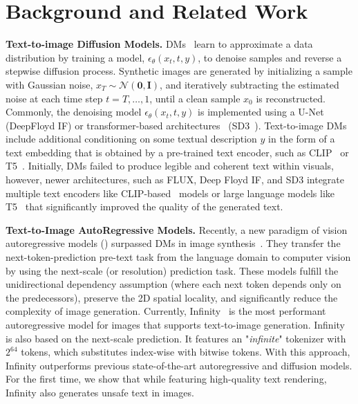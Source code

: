 \section{Background and Related Work}

\textbf{Text-to-image Diffusion Models.}
DMs~\citep{song2020,ho2020,rombach2022high} learn to approximate a data distribution by training a model, $\epsilon_\theta(x_t, t, y)$, to denoise samples and reverse a stepwise diffusion process. Synthetic images are generated by initializing a sample with Gaussian noise, $x_T \sim \mathcal{N}(\mathbf{0}, \mathbf{I})$, and iteratively subtracting the estimated noise at each time step $t = T, \ldots, 1$, until a clean sample $x_0$ is reconstructed. 
Commonly, the denoising model $\epsilon_\theta(x_t, t, y)$ is implemented using a U-Net~\citep{ronneberger2015unet} (\eg DeepFloyd IF) or transformer-based architectures~\citep{vaswani2017attention} (\eg SD3~\citep{esser2024scalingSD3}). 
Text-to-image DMs~\citep{dalle_2,rombach2022high,DeepFloydIF} include additional conditioning on some textual description $y$ in the form of a text embedding that is obtained by a pre-trained text encoder, such as CLIP~\citep{clip} or T5~\citep{raffel2020exploringT5}.
Initially, DMs failed to produce legible and coherent text within visuals, however, newer architectures, such as FLUX, Deep Floyd IF, and SD3 integrate multiple text encoders like CLIP-based~\citep{clip} models or large language models like T5~\citep{raffel2020exploringT5} that significantly improved the quality of the generated text.

\textbf{Text-to-Image AutoRegressive Models.} Recently, a new paradigm of vision autoregressive models (\VARs) surpassed DMs in image synthesis~\citep{tian2024visual,tang2024hart}. They transfer the next-token-prediction pre-text task from the language domain to computer vision by using the next-scale (or resolution) prediction task. These models fulfill the unidirectional dependency assumption (where each next token depends only on the predecessors), preserve the 2D spatial locality, and significantly reduce the complexity of image generation. Currently, Infinity~\citep{han2024infinity} is the most performant autoregressive model for images that supports text-to-image generation. Infinity is also based on the next-scale prediction. It features an "\textit{infinite}" tokenizer with $2^{64}$ tokens, which substitutes index-wise with bitwise tokens. With this approach, Infinity outperforms previous state-of-the-art autoregressive and diffusion models. For the first time, we show that while featuring high-quality text rendering, Infinity also generates unsafe text in images.

